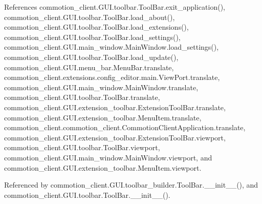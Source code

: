 References commotion\-\_\-client.\-G\-U\-I.\-toolbar.\-Tool\-Bar.\-exit\-\_\-application(), commotion\-\_\-client.\-G\-U\-I.\-toolbar.\-Tool\-Bar.\-load\-\_\-about(), commotion\-\_\-client.\-G\-U\-I.\-toolbar.\-Tool\-Bar.\-load\-\_\-extensions(), commotion\-\_\-client.\-G\-U\-I.\-toolbar.\-Tool\-Bar.\-load\-\_\-settings(), commotion\-\_\-client.\-G\-U\-I.\-main\-\_\-window.\-Main\-Window.\-load\-\_\-settings(), commotion\-\_\-client.\-G\-U\-I.\-toolbar.\-Tool\-Bar.\-load\-\_\-update(), commotion\-\_\-client.\-G\-U\-I.\-menu\-\_\-bar.\-Menu\-Bar.\-translate, commotion\-\_\-client.\-extensions.\-config\-\_\-editor.\-main.\-View\-Port.\-translate, commotion\-\_\-client.\-G\-U\-I.\-main\-\_\-window.\-Main\-Window.\-translate, commotion\-\_\-client.\-G\-U\-I.\-toolbar.\-Tool\-Bar.\-translate, commotion\-\_\-client.\-G\-U\-I.\-extension\-\_\-toolbar.\-Extension\-Tool\-Bar.\-translate, commotion\-\_\-client.\-G\-U\-I.\-extension\-\_\-toolbar.\-Menu\-Item.\-translate, commotion\-\_\-client.\-commotion\-\_\-client.\-Commotion\-Client\-Application.\-translate, commotion\-\_\-client.\-G\-U\-I.\-extension\-\_\-toolbar.\-Extension\-Tool\-Bar.\-viewport, commotion\-\_\-client.\-G\-U\-I.\-toolbar.\-Tool\-Bar.\-viewport, commotion\-\_\-client.\-G\-U\-I.\-main\-\_\-window.\-Main\-Window.\-viewport, and commotion\-\_\-client.\-G\-U\-I.\-extension\-\_\-toolbar.\-Menu\-Item.\-viewport.



Referenced by commotion\-\_\-client.\-G\-U\-I.\-toolbar\-\_\-builder.\-Tool\-Bar.\-\_\-\-\_\-init\-\_\-\-\_\-(), and commotion\-\_\-client.\-G\-U\-I.\-toolbar.\-Tool\-Bar.\-\_\-\-\_\-init\-\_\-\-\_\-().


